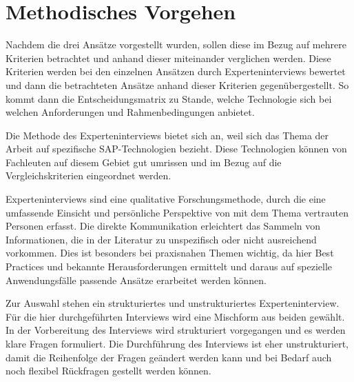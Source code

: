 \section{Methodisches Vorgehen}

Nachdem die drei Ansätze vorgestellt wurden, sollen diese im Bezug auf mehrere Kriterien betrachtet und anhand dieser miteinander verglichen werden. Diese Kriterien werden bei den einzelnen Ansätzen durch Experteninterviews bewertet und dann die betrachteten Ansätze anhand dieser Kriterien gegenübergestellt. So kommt dann die Entscheidungsmatrix zu Stande, welche Technologie sich bei welchen Anforderungen und Rahmenbedingungen anbietet.

Die Methode des Experteninterviews bietet sich an, weil sich das Thema der Arbeit auf spezifische SAP-Technologien bezieht. Diese Technologien können von Fachleuten auf diesem Gebiet gut umrissen und im Bezug auf die Vergleichskriterien eingeordnet werden.

Experteninterviews sind eine qualitative Forschungsmethode, durch die eine umfassende Einsicht und persönliche Perspektive von mit dem Thema vertrauten Personen erfasst. Die direkte Kommunikation erleichtert das Sammeln von Informationen, die in der Literatur zu unspezifisch oder nicht ausreichend vorkommen. Dies ist besonders bei praxisnahen Themen wichtig, da hier Best Practices und bekannte Herausforderungen ermittelt und daraus auf spezielle Anwendungsfälle passende Ansätze erarbeitet werden können.

Zur Auswahl stehen ein strukturiertes und unstrukturiertes Experteninterview. Für die hier durchgeführten Interviews wird eine Mischform aus beiden gewählt. In der Vorbereitung des Interviews wird strukturiert vorgegangen und es werden klare Fragen formuliert. Die Durchführung des Interviews ist eher unstrukturiert, damit die Reihenfolge der Fragen geändert werden kann und bei Bedarf auch noch flexibel Rückfragen gestellt werden können.
